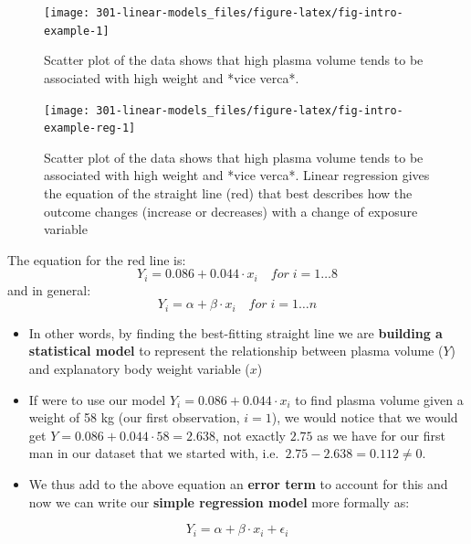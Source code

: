 \documentclass[
]{book}
\providecommand{\tightlist}{%
  \setlength{\itemsep}{0pt}\setlength{\parskip}{0pt}}
\theoremstyle{definition}
\theoremstyle{definition}
\theoremstyle{definition}
\theoremstyle{remark}
\begin{document}
\begin{figure}

{\centering \texttt{[image: 301-linear-models\_files/figure-latex/fig-intro-example-1]} 

}

\caption{Scatter plot of the data shows that high plasma volume tends to be associated with high weight and *vice verca*.}\label{fig:fig-intro-example}
\end{figure}

\begin{figure}

{\centering \texttt{[image: 301-linear-models\_files/figure-latex/fig-intro-example-reg-1]} 

}

\caption{Scatter plot of the data shows that high plasma volume tends to be associated with high weight and *vice verca*. Linear regression gives the equation of the straight line (red) that best describes how the outcome changes (increase or decreases) with a change of exposure variable}\label{fig:fig-intro-example-reg}
\end{figure}

The equation for the red line is:
\[Y_i=0.086 +  0.044 \cdot x_i \quad for \;i = 1 \dots 8\]
and in general:
\[Y_i=\alpha + \beta \cdot x_i \quad for \; i = 1 \dots n\]

\begin{itemize}
\tightlist
\item
  In other words, by finding the best-fitting straight line we are \textbf{building a statistical model} to represent the relationship between plasma volume (\(Y\)) and explanatory body weight variable (\(x\))
\item
  If were to use our model \(Y_i=0.086 + 0.044 \cdot x_i\) to find plasma volume given a weight of 58 kg (our first observation, \(i=1\)), we would notice that we would get \(Y=0.086 + 0.044 \cdot 58 = 2.638\), not exactly \(2.75\) as we have for our first man in our dataset that we started with, i.e.~\(2.75 - 2.638 = 0.112 \neq 0\).
\item
  We thus add to the above equation an \textbf{error term} to account for this and now we can write our \textbf{simple regression model} more formally as:
\end{itemize}

\begin{equation}
Y_i=\alpha + \beta \cdot x_i + \epsilon_i
\label{eq:regression-linear}
\end{equation}
\end{document}
